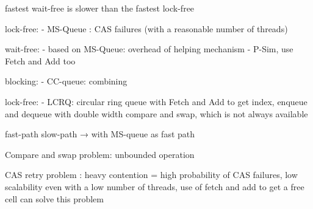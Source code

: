 fastest wait-free is slower than the fastest lock-free

lock-free:
 - MS-Queue : CAS failures (with a reasonable number of threads)

wait-free:
- based on MS-Queue: overhead of helping mechanism
- P-Sim, use Fetch and Add too

blocking:
- CC-queue: combining

lock-free:
- LCRQ: circular ring queue with Fetch and Add to get index, enqueue and dequeue
with double width compare and swap, which is not always available

fast-path slow-path → with MS-queue as fast path

Compare and swap problem: unbounded operation


CAS retry problem : heavy contention = high probability of CAS failures, low
scalability even with a low number of threads, use of fetch and add to get a
free cell can solve this problem
